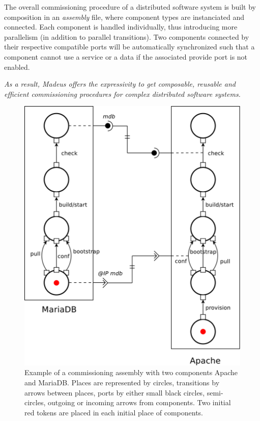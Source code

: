 The overall commissioning procedure of a distributed software system
is built by composition in an \emph{assembly} file, where component
types are instanciated and connected. Each component is handled
individually, thus introducing more parallelism (in addition to
parallel transitions). Two components connected by their respective
compatible ports will be automatically synchronized such that a
component cannot use a service or a data if the associated provide
port is not enabled.

\emph{As a result, Madeus offers the expressivity to get composable,
reusable and efficient commissioning procedures for complex
distributed software systems.}

\begin{figure}[tbp]
  \begin{center}
    \includegraphics[width=0.35\linewidth]{./images/apachebdd.pdf}
  \end{center}
  \caption{Example of a commissioning assembly with two components
    Apache and MariaDB. Places are represented by circles, transitions
    by arrows between places, ports by either small black circles,
    semi-circles, outgoing or incoming arrows from components. Two
    initial red tokens are placed in each initial place of
    components.}
  \label{fig:example}
\end{figure}

